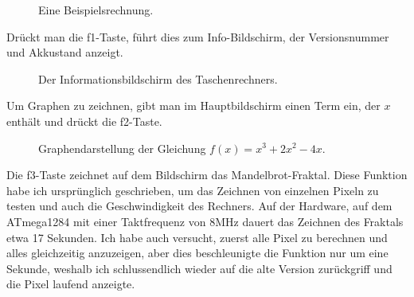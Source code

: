 \documentclass[12pt, a4paper]{report}
\begin{document}
\begin{figure}[H]
\centering
{}
\caption{Eine Beispielsrechnung.}
\end{figure}

\noindent
Drückt man die f1-Taste, führt dies zum Info-Bildschirm, der Versionsnummer und Akkustand anzeigt.

\begin{figure}[H]
\centering
{}
\caption{Der Informationsbildschirm des Taschenrechners.}
\end{figure}

\noindent
Um Graphen zu zeichnen, gibt man im Hauptbildschirm einen Term ein, der $x$ enthält und drückt die f2-Taste.

\begin{figure}[H]
	\hspace{2cm}
\caption{Graphendarstellung der Gleichung $f(x)=x^3+2x^2-4x$.}
\end{figure}

\noindent
Die f3-Taste zeichnet auf dem Bildschirm das Mandelbrot-Fraktal. Diese Funktion habe ich ursprünglich geschrieben, um das Zeichnen von einzelnen Pixeln zu testen und auch die Geschwindigkeit des Rechners. Auf der Hardware, auf dem ATmega1284 mit einer Taktfrequenz von 8MHz dauert das Zeichnen des Fraktals etwa 17 Sekunden. Ich habe auch versucht, zuerst alle Pixel zu berechnen und alles gleichzeitig anzuzeigen, aber dies beschleunigte die Funktion nur um eine Sekunde, weshalb ich schlussendlich wieder auf die alte Version zurückgriff und die Pixel laufend anzeigte.
\end{document}
